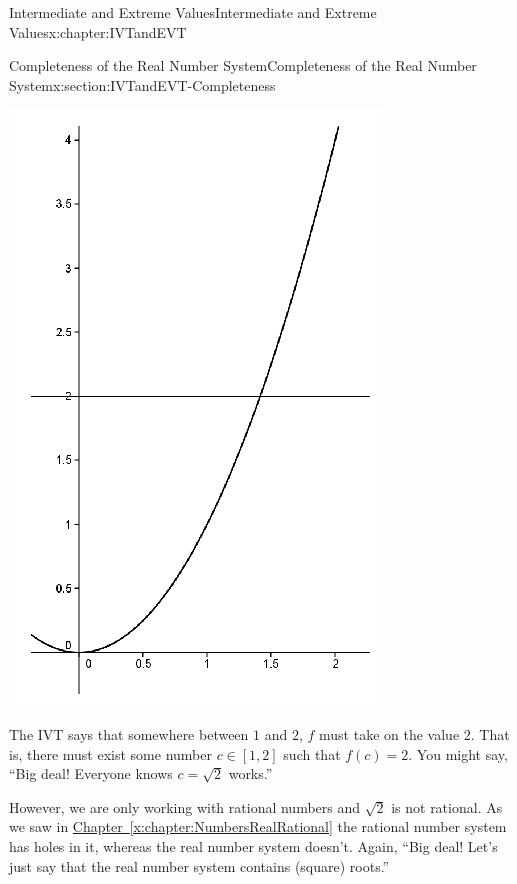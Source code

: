 \begin{chapterptx}{Intermediate and Extreme Values}{}{Intermediate and Extreme Values}{}{}{x:chapter:IVTandEVT}
\begin{sectionptx}{Completeness of the Real Number System}{}{Completeness of the Real Number System}{}{}{x:section:IVTandEVT-Completeness}
\begin{image}{0.315}{0.37}{0.315}
			\includegraphics[width=\linewidth]{external/images/Ch6fig1.png}
		\end{image}%
		The IVT says that somewhere between \(1\) and \(2\), \(f\) must take on the value \(2\). That is, there must exist some number \(c\in[1,2]\) such that \(f(c)=2\). You might say, ``Big deal! Everyone knows \(c=\sqrt{2}\) works.''%
		\par
		However, we are only working with rational numbers and \(\sqrt{2}\) \(\)is not rational. As we saw in \hyperref[x:chapter:NumbersRealRational]{Chapter~{\xreffont\ref{x:chapter:NumbersRealRational}}} the rational number system has holes in it, whereas the real number system doesn't. Again, ``Big deal! Let's just say that the real number system contains (square) roots.''%

\end{sectionptx}
\end{chapterptx}
